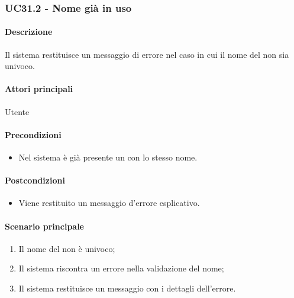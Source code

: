 \subsubsection{UC31.2 - Nome già in uso}\label{UC31point2}
\paragraph*{Descrizione}
Il sistema restituisce un messaggio di errore nel caso in cui il nome del  non sia univoco.

\paragraph*{Attori principali}
Utente

\paragraph*{Precondizioni}
\begin{itemize}
  \item Nel sistema è già presente un  con lo stesso nome.
\end{itemize}

\paragraph*{Postcondizioni}
\begin{itemize}
  \item Viene restituito un messaggio d'errore esplicativo.
\end{itemize}

\paragraph*{Scenario principale}
\begin{enumerate}
  \item Il nome del  non è univoco;
  \item Il sistema riscontra un errore nella validazione del nome;
  \item Il sistema restituisce un messaggio con i dettagli dell'errore.  
\end{enumerate}